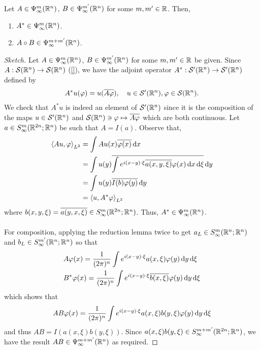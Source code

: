 \documentclass[12pt]{article}
\begin{document}
\begin{ftheorem}[Composition]
    Let $A \in \Psi^{m}_\infty(\R^n)$, $B \in \Psi^{m'}_\infty(\R^n)$ for some $m, m' \in \R$. Then, 
    \begin{enumerate}
        \item $A^* \in \Psi^{m}_\infty(\R^n)$.
        \item $A \circ B \in \Psi^{m + m'}_\infty(\R^n)$. 
    \end{enumerate}
\end{ftheorem}
\begin{proof}[Sketch]
    Let $A \in \Psi^{m}_\infty(\R^n)$, $B \in \Psi^{m'}_\infty(\R^n)$ for some $m, m' \in \R$ be given. 
    Since $A : \sch(\R^n) \to \sch(\R^n)$ (\ref{}), we have the adjoint operator $A^* : \sch'(\R^n) \to \sch'(\R^n)$ defined by 
    \begin{align*}
        A^*u(\varphi) = u(\overline{A\varphi}), \quad u \in \sch'(\R^n), \varphi \in \sch(\R^n). 
    \end{align*}
    We check that $A^*u$ is indeed an element of $\sch'(\R^n)$ since it is the composition of the maps $u \in \sch'(\R^n)$ and $\sch(\R^n) \ni \varphi \mapsto \overline{A\varphi}$ which are both continuous.  Let $a \in S^{m}_\infty(\R^{2n}; \R^n)$ be such that $A = I(a)$. Observe that, 
    \begin{align*}
        \inprod[Au, \varphi]_{L^2} 
        & = \int Au(x) \overline{\varphi(x)}\d[x]  \\
        & = \int u(y) \overline{\int e^{i(x -y) \cdot \xi} \overline{a(x, y, \xi)} \varphi(x) \d[x] \d[\xi]} \d[y] \\
        & = \int u(y) \overline{I(b) \varphi(y)}\d[y]\\
        & = \inprod[u, A^*\varphi]_{L^2}
    \end{align*}
    where $b(x, y, \xi) = \overline{a(y, x, \xi)} \in S^{m}_\infty(\R^{2n}; \R^n)$. Thus, $A^* \in \Psi^{m}_\infty(\R^n)$. \\
    \\
    For composition, applying the reduction lemma twice to get $a_L \in S^{m}_\infty(\R^{n}; \R^n)$ and $b_L \in S^{m'}_\infty(\R^{n}; \R^n)$ so that 
    \begin{align*}
        &A \varphi(x) = \frac{1}{(2\pi)^n} \int e^{i(x -y) \cdot \xi} a(x, \xi) \varphi(y) \d[y] \d[\xi] \\
        &B^* \varphi(x) = \frac{1}{(2\pi)^n} \int e^{i(x -y) \cdot \xi} \overline{b(x, \xi) }\varphi(y) \d[y] \d[\xi]
    \end{align*}
    which shows that 
    \begin{align*}
        AB\varphi(x) = \frac{1}{(2\pi)^n} \int e^{i(x -y) \cdot \xi} a(x, \xi) b(y, \xi) \varphi(y) \d[y] \d[\xi]
    \end{align*}
    and thus $AB = I(a(x, \xi) b(y, \xi))$. Since $a(x, \xi)b(y, \xi) \in S^{m + m'}_\infty(\R^{2n}; \R^n)$, we have the result $AB \in \Psi^{m + m'}_\infty(\R^n)$ as required. 
    
\end{proof}
\end{document}
